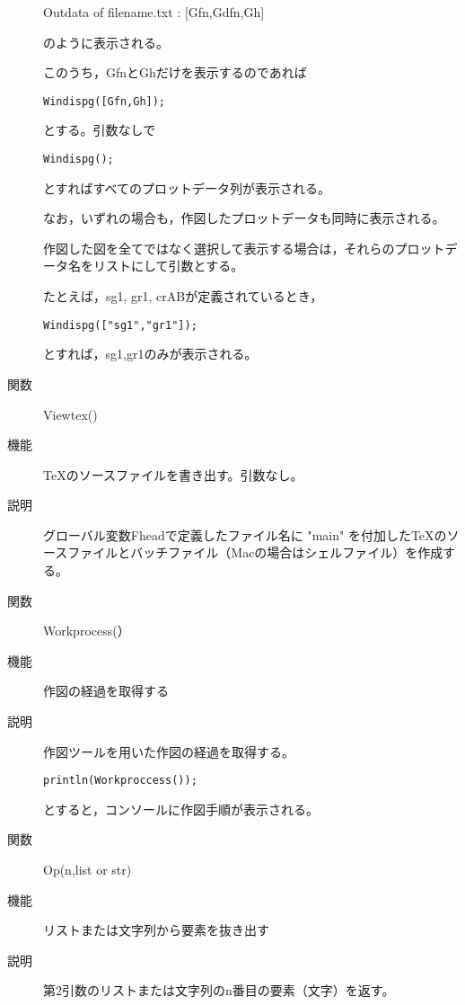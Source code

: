 \documentclass[papersize,a4paper,10pt,uplatex]{jsarticle}
\begin{document}
\begin{description}
\hspace{10mm}Outdata of filename.txt : [Gfn,Gdfn,Gh] 

のように表示される。

このうち，GfnとGhだけを表示するのであれば

\hspace{10mm}\verb|Windispg([Gfn,Gh]);|

とする。引数なしで
 
\hspace{10mm}\verb|Windispg();|

とすればすべてのプロットデータ列が表示される。

なお，いずれの場合も，作図したプロットデータも同時に表示される。

作図した図を全てではなく選択して表示する場合は，それらのプロットデータ名をリストにして引数とする。

たとえば，sg1, gr1, crABが定義されているとき，

\hspace{10mm}\verb|Windispg(["sg1","gr1"]);|

とすれば，sg1,gr1のみが表示される。


\vspace{\baselineskip}
\hypertarget{viewtex}{}
\item[関数]Viewtex()
\item[機能]\TeX のソースファイルを書き出す。引数なし。
\item[説明]グローバル変数Fheadで定義したファイル名に "main" を付加した\TeX のソースファイルとバッチファイル（Macの場合はシェルファイル）を作成する。
 
\vspace{\baselineskip}
\hypertarget{workprocess}{}
\item[関数]Workprocess(）
\item[機能]作図の経過を取得する
\item[説明]作図ツールを用いた作図の経過を取得する。

\verb|println(Workproccess());|

とすると，コンソールに作図手順が表示される。

\vspace{\baselineskip}
\hypertarget{op}{}
\item[関数]Op(n,list or str)
\item[機能]リストまたは文字列から要素を抜き出す
\item[説明]第2引数のリストまたは文字列のn番目の要素（文字）を返す。


\end{description}
\end{document}
